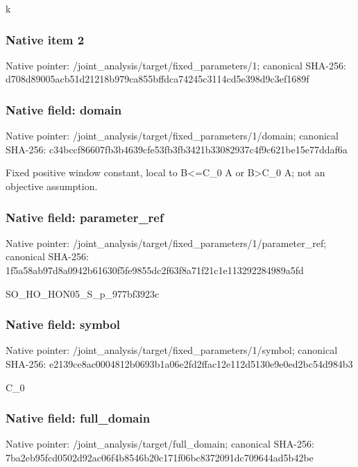 \documentclass[10pt,a4paper]{article}
\begin{document}
\begingroup\raggedright\sloppy k\par\endgroup

\subsubsection{Native item 2}
Native pointer: /joint\_\allowbreak{}analysis/target/fixed\_\allowbreak{}parameters/1; canonical SHA-256: d708d89005acb51d21218b979ca855bffdca74245c3114cd5e398d9c3ef1689f

\subsubsection{Native field: domain}
Native pointer: /joint\_\allowbreak{}analysis/target/fixed\_\allowbreak{}parameters/1/domain; canonical SHA-256: c34bccf86607fb3b4639cfe53fb3fb3421b33082937c4f9c621be15e77ddaf6a

\begingroup\raggedright\sloppy Fixed positive window constant,\allowbreak{} local to B<=\allowbreak{}C\_\allowbreak{}0 A or B>C\_\allowbreak{}0 A;\allowbreak{} not an objective assumption.\par\endgroup

\subsubsection{Native field: parameter\_\allowbreak{}ref}
Native pointer: /joint\_\allowbreak{}analysis/target/fixed\_\allowbreak{}parameters/1/parameter\_\allowbreak{}ref; canonical SHA-256: 1f5a58ab97d8a0942b61630f5fe9855dc2f63f8a71f21c1e113292284989a5fd

\begingroup\raggedright\sloppy SO\_\allowbreak{}HO\_\allowbreak{}HON05\_\allowbreak{}S\_\allowbreak{}p\_\allowbreak{}977bf3923c\par\endgroup

\subsubsection{Native field: symbol}
Native pointer: /joint\_\allowbreak{}analysis/target/fixed\_\allowbreak{}parameters/1/symbol; canonical SHA-256: e2139ce8ac0004812b0693b1a06e2fd2ffac12e112d5130e9e0ed2bc54d984b3

\begingroup\raggedright\sloppy C\_\allowbreak{}0\par\endgroup

\subsubsection{Native field: full\_\allowbreak{}domain}
Native pointer: /joint\_\allowbreak{}analysis/target/full\_\allowbreak{}domain; canonical SHA-256: 7ba2eb95fcd0502d92ac06f4b8546b20c171f06bc8372091dc709644ad5b42be
\end{document}
